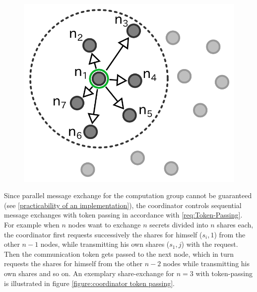 \begin{figure}[!htb]
{		\includegraphics[scale=1.0]{figures/coordinator-5.png}
		\label{figure:Formation of fully meshed computation group - e}
	}%
	\hfill
\end{figure}

Since parallel message exchange for the computation group cannot be guaranteed (see \autoref{practicability of an implementation}), the coordinator controls sequential message exchanges with token passing in accordance with \ref{req:Token-Passing}. For example when $n$ nodes want to exchange $n$ secrets divided into $n$ shares each, the coordinator first requests successively the shares for himself ($s_i,1$) from the other $n-1$ nodes, while transmitting his own shares ($s_1,j$) with the request. Then the communication token gets passed to the next node, which in turn requests the shares for himself from the other $n-2$ nodes while transmitting his own shares and so on. An exemplary share-exchange for $n=3$ with token-passing is illustrated in figure \ref{figure:coordinator token passing}.

